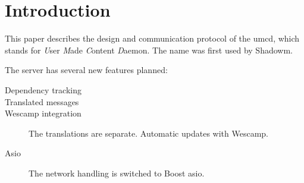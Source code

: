 \chapter{Introduction}
\label{chapter:introduction}

This paper describes the design and communication protocol of the umcd,
which stands for \emph{U}ser \emph{M}ade \emph{C}ontent \emph{D}aemon. The
name was first used by Shadowm.

The server has several new features planned:
\begin{description}
\item[Dependency tracking]


\item[Translated messages]

\item[Wescamp integration]
	The translations are separate. Automatic updates with Wescamp.

\item[Asio]
	The network handling is switched to Boost asio.

\end{description}

